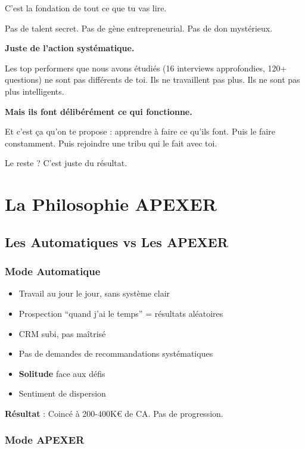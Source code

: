 \documentclass[12pt,a4paper,openany]{book}
\begin{document}
\vspace{1.5cm}

C'est la fondation de tout ce que tu vas lire.

Pas de talent secret. Pas de gène entrepreneurial. Pas de don mystérieux.

\textbf{Juste de l'action systématique.}

Les top performers que nous avons étudiés (16 interviews approfondies, 120+ questions) ne sont pas différents de toi. Ils ne travaillent pas plus. Ils ne sont pas plus intelligents.

\textbf{Mais ils font délibérément ce qui fonctionne.}

Et c'est ça qu'on te propose : apprendre à faire ce qu'ils font. Puis le faire constamment. Puis rejoindre une tribu qui le fait avec toi.

Le reste ? C'est juste du résultat.

\clearpage

\chapter{La Philosophie APEXER}

\section{Les Automatiques vs Les APEXER}

\subsection{Mode Automatique}

\begin{itemize}
\item Travail au jour le jour, sans système clair
\item Prospection ``quand j'ai le temps'' = résultats aléatoires
\item CRM subi, pas maîtrisé
\item Pas de demandes de recommandations systématiques
\item \textbf{Solitude} face aux défis
\item Sentiment de dispersion
\end{itemize}

\textbf{Résultat} : Coincé à 200-400K\euro{} de CA. Pas de progression.

\subsection{Mode APEXER}
\end{document}
